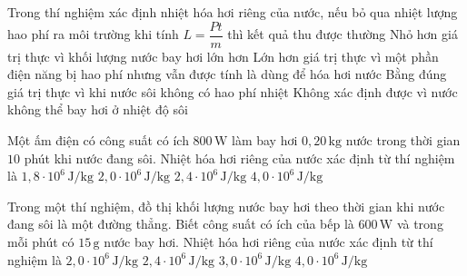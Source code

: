 \begin{ex}
Trong thí nghiệm xác định nhiệt hóa hơi riêng của nước, nếu bỏ qua nhiệt lượng hao phí ra môi trường khi tính $L=\dfrac{Pt}{m}$ thì kết quả thu được thường
\choice
{Nhỏ hơn giá trị thực vì khối lượng nước bay hơi lớn hơn}
{\True Lớn hơn giá trị thực vì một phần điện năng bị hao phí nhưng vẫn được tính là dùng để hóa hơi nước}
{Bằng đúng giá trị thực vì khi nước sôi không có hao phí nhiệt}
{Không xác định được vì nước không thể bay hơi ở nhiệt độ sôi}
\end{ex}

\begin{ex}
Một ấm điện có công suất có ích $800\,\mathrm{W}$ làm bay hơi $0,20\,\mathrm{kg}$ nước trong thời gian $10$ phút khi nước đang sôi. Nhiệt hóa hơi riêng của nước xác định từ thí nghiệm là
\choice
{$1,8\cdot 10^6\,\mathrm{J/kg}$}
{$2,0\cdot 10^6\,\mathrm{J/kg}$}
{\True $2,4\cdot 10^6\,\mathrm{J/kg}$}
{$4,0\cdot 10^6\,\mathrm{J/kg}$}
\end{ex}

\begin{ex}
Trong một thí nghiệm, đồ thị khối lượng nước bay hơi theo thời gian khi nước đang sôi là một đường thẳng. Biết công suất có ích của bếp là $600\,\mathrm{W}$ và trong mỗi phút có $15\,\mathrm{g}$ nước bay hơi. Nhiệt hóa hơi riêng của nước xác định từ thí nghiệm là
\choice
{$2,0\cdot 10^6\,\mathrm{J/kg}$}
{\True $2,4\cdot 10^6\,\mathrm{J/kg}$}
{$3,0\cdot 10^6\,\mathrm{J/kg}$}
{$4,0\cdot 10^6\,\mathrm{J/kg}$}
\end{ex}

